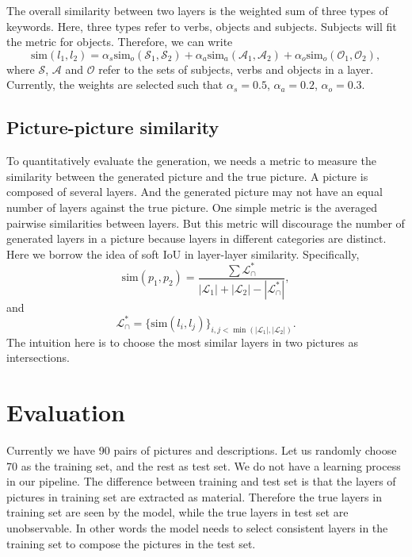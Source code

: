 \documentclass{article} %
\begin{document}
The overall similarity between two layers is the weighted sum of three types of keywords. Here, three types refer to verbs, objects and subjects. Subjects will fit the metric for objects. Therefore, we can write
$$
\mathrm{sim}(l_1,l_2) = \alpha_s \mathrm{sim}_o(\mathcal{S}_1, \mathcal{S}_2) + \alpha_a \mathrm{sim}_a(\mathcal{A}_1, \mathcal{A}_2) + \alpha_o \mathrm{sim}_o(\mathcal{O}_1, \mathcal{O}_2),
$$
where $\mathcal{S}$, $\mathcal{A}$ and $\mathcal{O}$ refer to the sets of subjects, verbs and objects in a layer. Currently, the weights are selected such that $\alpha_s = 0.5$, $\alpha_a = 0.2$, $\alpha_o = 0.3$.

\subsection{Picture-picture similarity}
To quantitatively evaluate the generation, we needs a metric to measure the similarity between the generated picture and the true picture. A picture is composed of several layers. And the generated picture may not have an equal number of layers against the true picture. One simple metric is the averaged pairwise similarities between layers. But this metric will discourage the number of generated layers in a picture because layers in different categories are distinct. Here we borrow the idea of soft IoU in layer-layer similarity. Specifically,
$$
\mathrm{sim}(p_1,p_2) = \frac{\sum\mathcal{L}^*_\cap}{|\mathcal{L}_1|+|\mathcal{L}_2| - |\mathcal{L}^*_\cap|},
$$
and
$$
\mathcal{L}^*_\cap = \{\mathrm{sim}(l_i, l_j)\}_{i,j<\min(|\mathcal{L}_1|,|\mathcal{L}_2|)}.
$$
The intuition here is to choose the most similar layers in two pictures as intersections. 
 
 
\section{Evaluation}
Currently we have 90 pairs of pictures and descriptions. Let us randomly choose 70 as the training set, and the rest as test set. We do not have a learning process in our pipeline. The difference between training and test set is that the layers of pictures in training set are extracted as material. Therefore the true layers in training set are seen by the model, while the true layers in test set are unobservable. In other words the model needs to select consistent layers in the training set to compose the pictures in the test set.
\end{document}
